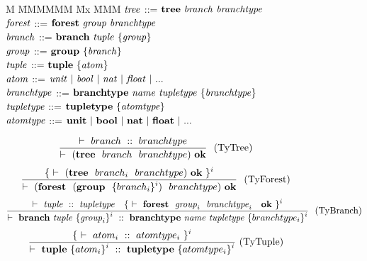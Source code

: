 \begin{figure}[!ht]

\begin{tabbing}
M \= MMMMMM \= Mx \= MMM \kill
\> $\mathit{tree}$        \> ::= \> $\mathbf{tree}~ \mathit{branch}~ \mathit{branchtype}$
\\
\> $\mathit{forest}$      \> ::= \> $\mathbf{forest}~ \mathit{group}~ \mathit{branchtype}$
\\[1ex]
\> $\mathit{branch}$      \> ::= \> $\mathbf{branch}~ \mathit{tuple}~ \{ \mathit{group} \}$
\\
\> $\mathit{group}$       \> ::= \> $\mathbf{group}~ \{ \mathit{branch} \}$
\\
\> $\mathit{tuple}$       \> ::= \> $\mathbf{tuple}~ \{ \mathit{atom} \}$
\\
\> $\mathit{atom}$        \> ::= \> $\mathit{unit} ~|~ \mathit{bool} ~|~ \mathit{nat} ~|~  \mathit{float} ~|~ ...$
\\[1ex]
\> $\mathit{branchtype}$  \> ::= \> $\mathbf{branchtype}~ \mathit{name}~ \mathit{tupletype}~ \{ \mathit{branchtype} \}$
\\
\> $\mathit{tupletype}$   \> ::= \> $\mathbf{tupletype}~  \{ \mathit{atomtype} \}$
\\
\> $\mathit{atomtype}$    \> ::= \> $\mathbf{unit} ~|~ \mathbf{bool} ~|~ \mathbf{nat} ~|~ \mathbf{float} ~|~ ...$
\end{tabbing}

$$
\frac {\displaystyle     \vdash ~ branch ~::~ branchtype} {\displaystyle     \vdash ~ (\mathbf{tree}~~ branch~~ branchtype) ~ \textbf{ok}} \ 
~\textrm{(TyTree)}
$$
$$
\frac {\displaystyle \{~ \vdash ~ (\mathbf{tree}~~    branch_i~~ branchtype) ~ \textbf{ok} ~\}^i} {\displaystyle     \vdash ~ (\mathbf{forest}~~  (\mathbf{group}~~ \{ branch_i \}^i)~~ branchtype) ~ \textbf{ok} } \ 
~\textrm{(TyForest)}
$$
$$
\frac {\displaystyle     \vdash ~ \mathit{tuple} ~::~ \mathit{tupletype}      \quad
         \{~ \vdash ~  \mathbf{forest}~~ \mathit{group}_i~~ \mathit{branchtype}_i ~~ ~ \textbf{ok} ~\}^i
        } {\displaystyle     \vdash ~  \mathbf{branch}~     \mathit{tuple}~ \{ \mathit{group}_i \}^i  ~::~  \mathbf{branchtype}~ \mathit{name}~  \mathit{tupletype}~ \{ branchtype_i \}^i 
        } \ 
~\textrm{(TyBranch)}
$$
$$
\frac {\displaystyle \{~ \vdash ~  atom_i  ~::~  atomtype_i  ~\}^i } {\displaystyle     \vdash ~  \mathbf{tuple}~ \{ atom_i \}^i  ~::~  \mathbf{tupletype}~ \{ atomtype_i \}^i } \ 
\textrm{(TyTuple)}
$$      


\end{figure}


